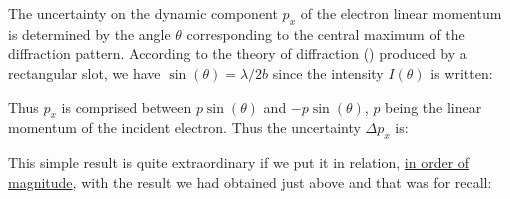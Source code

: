 	The uncertainty on the dynamic component $p_x$ of the electron linear momentum is determined by the angle $\theta$ corresponding to the central maximum of the diffraction pattern. According to the theory of diffraction () produced by a rectangular slot, we have $\sin(\theta)=\lambda/2b$ since the intensity $I(\theta)$ is written:
	
	Thus $p_x$ is comprised between $p\sin(\theta)$ and $-p\sin(\theta)$, $p$ being the linear momentum of the incident electron. Thus the uncertainty $\Delta p_x$ is:
	
	This simple result is quite extraordinary if we put it in relation, \underline{in order of magnitude}, with the result we had obtained just above and that was for recall:
	
